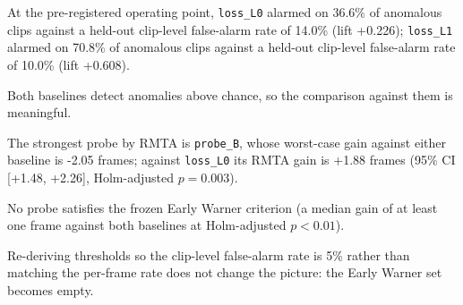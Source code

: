 At the pre-registered operating point, \texttt{loss\_L0} alarmed on 36.6\% of anomalous clips against a held-out clip-level false-alarm rate of 14.0\% (lift +0.226); \texttt{loss\_L1} alarmed on 70.8\% of anomalous clips against a held-out clip-level false-alarm rate of 10.0\% (lift +0.608).

Both baselines detect anomalies above chance, so the comparison against them is meaningful.

The strongest probe by RMTA is \texttt{probe\_B}, whose worst-case gain against either baseline is -2.05 frames; against \texttt{loss\_L0} its RMTA gain is +1.88 frames (95\% CI [+1.48, +2.26], Holm-adjusted $p=0.003$).

No probe satisfies the frozen Early Warner criterion (a median gain of at least one frame against both baselines at Holm-adjusted $p<0.01$).

Re-deriving thresholds so the clip-level false-alarm rate is 5\% rather than matching the per-frame rate does not change the picture: the Early Warner set becomes empty.
